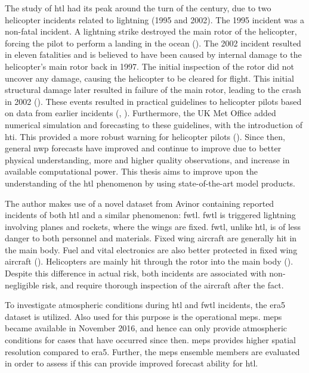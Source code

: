 The study of \acrshort{htl} had its peak around the turn of the century, due to two helicopter incidents related to lightning (1995 and 2002). The 1995 incident was a non-fatal incident. A lightning strike destroyed the main rotor of the helicopter, forcing the pilot to perform a landing in the ocean (\cite{smart1997}). The 2002 incident resulted in eleven fatalities and is believed to have been caused by internal damage to the helicopter's main rotor back in 1997. The initial inspection of the rotor did not uncover any damage, causing the helicopter to be cleared for flight. This initial structural damage later resulted in failure of the main rotor, leading to the crash in 2002 (\cite{smart2005}). These events resulted in practical guidelines to helicopter pilots based on data from earlier incidents (\cite{lande1999}, \cite{hardwick1999}). Furthermore, the UK Met Office added numerical simulation and forecasting to these guidelines, with the introduction of \acrfull{hti}. This provided a more robust warning for helicopter pilots (\cite{wilkinson2013}). Since then, general \acrfull{nwp} forecasts have improved and continue to improve due to better  physical understanding, more and higher quality observations, and increase in available computational power. This thesis aims to improve upon the understanding of the \acrshort{htl} phenomenon by using state-of-the-art model products.

The author makes use of a novel dataset from Avinor containing reported incidents of both  \acrshort{htl} and a similar phenomenon: \acrfull{fwtl}. \acrshort{fwtl} is triggered lightning involving planes and rockets, where the wings are fixed. \acrshort{fwtl}, unlike \acrshort{htl}, is of less danger to both personnel and materials. Fixed wing aircraft are generally hit in the main body. Fuel and vital electronics are also better protected in fixed wing aircraft (\cite{petrov2012}). Helicopters are mainly hit through the rotor into the main body (\cite{lande1999}). Despite this difference in actual risk, both incidents are associated with non-negligible risk, and require thorough inspection of the aircraft after the fact.

To investigate atmospheric conditions during \acrshort{htl} and \acrshort{fwtl} incidents, the \acrfull{era5} dataset is utilized. Also used for this purpose is the operational \acrfull{meps}. \acrshort{meps} became available in November 2016, and hence can only provide atmospheric conditions for cases that have occurred since then. \acrshort{meps} provides higher spatial resolution compared to \acrshort{era5}. Further, the \acrshort{meps} ensemble members are evaluated in order to assess if this can provide improved forecast ability for \acrshort{htl}.

